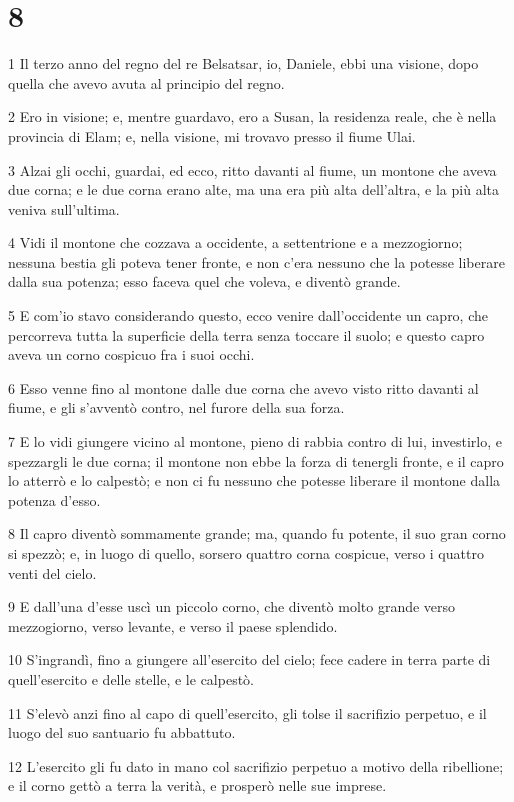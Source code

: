 \chapter{8}

\par 1 Il terzo anno del regno del re Belsatsar, io, Daniele, ebbi una visione, dopo quella che avevo avuta al principio del regno.
\par 2 Ero in visione; e, mentre guardavo, ero a Susan, la residenza reale, che è nella provincia di Elam; e, nella visione, mi trovavo presso il fiume Ulai.
\par 3 Alzai gli occhi, guardai, ed ecco, ritto davanti al fiume, un montone che aveva due corna; e le due corna erano alte, ma una era più alta dell'altra, e la più alta veniva sull'ultima.
\par 4 Vidi il montone che cozzava a occidente, a settentrione e a mezzogiorno; nessuna bestia gli poteva tener fronte, e non c'era nessuno che la potesse liberare dalla sua potenza; esso faceva quel che voleva, e diventò grande.
\par 5 E com'io stavo considerando questo, ecco venire dall'occidente un capro, che percorreva tutta la superficie della terra senza toccare il suolo; e questo capro aveva un corno cospicuo fra i suoi occhi.
\par 6 Esso venne fino al montone dalle due corna che avevo visto ritto davanti al fiume, e gli s'avventò contro, nel furore della sua forza.
\par 7 E lo vidi giungere vicino al montone, pieno di rabbia contro di lui, investirlo, e spezzargli le due corna; il montone non ebbe la forza di tenergli fronte, e il capro lo atterrò e lo calpestò; e non ci fu nessuno che potesse liberare il montone dalla potenza d'esso.
\par 8 Il capro diventò sommamente grande; ma, quando fu potente, il suo gran corno si spezzò; e, in luogo di quello, sorsero quattro corna cospicue, verso i quattro venti del cielo.
\par 9 E dall'una d'esse uscì un piccolo corno, che diventò molto grande verso mezzogiorno, verso levante, e verso il paese splendido.
\par 10 S'ingrandì, fino a giungere all'esercito del cielo; fece cadere in terra parte di quell'esercito e delle stelle, e le calpestò.
\par 11 S'elevò anzi fino al capo di quell'esercito, gli tolse il sacrifizio perpetuo, e il luogo del suo santuario fu abbattuto.
\par 12 L'esercito gli fu dato in mano col sacrifizio perpetuo a motivo della ribellione; e il corno gettò a terra la verità, e prosperò nelle sue imprese.
